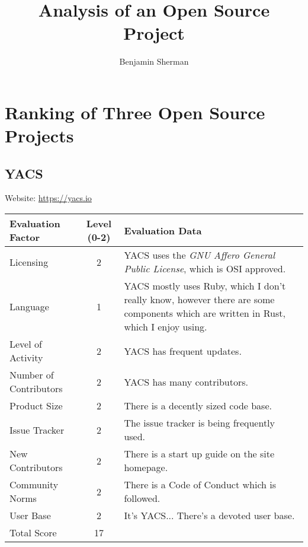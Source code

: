 \documentclass[11pt]{article}
\title{\vspace{-3em}\bf Analysis of an Open Source Project}
\author{Benjamin Sherman}
\date{}
\begin{document}
\maketitle

\section{Ranking of Three Open Source Projects}
\subsection{YACS}
\nopagebreak
Website: \url{https://yacs.io}
\nopagebreak
\begin{center}
\begin{tabularx}{\textwidth}{|l|c|X|}
	\hline
	\textbf{Evaluation Factor} & \textbf{Level (0-2)} & \textbf{Evaluation Data} \\\hline
	Licensing & 2 & YACS uses the \textit{GNU Affero General Public License}, which is OSI approved.\\\hline
	Language & 1 & YACS mostly uses Ruby, which I don't really know, however there are some components which are written in Rust, which I enjoy using.\\\hline
	Level of Activity & 2 & YACS has frequent updates.\\\hline
	Number of Contributors & 2 & YACS has many contributors.\\\hline
	Product Size & 2 & There is a decently sized code base.\\\hline
	Issue Tracker & 2 & The issue tracker is being frequently used.\\\hline
	New Contributors & 2 & There is a start up guide on the site homepage.\\\hline
	Community Norms & 2 & There is a Code of Conduct which is followed.\\\hline
	User Base & 2 & It's YACS... There's a devoted user base.\\\hline
	Total Score & 17 & \\\hline
\end{tabularx}
\end{center}
\end{document}
